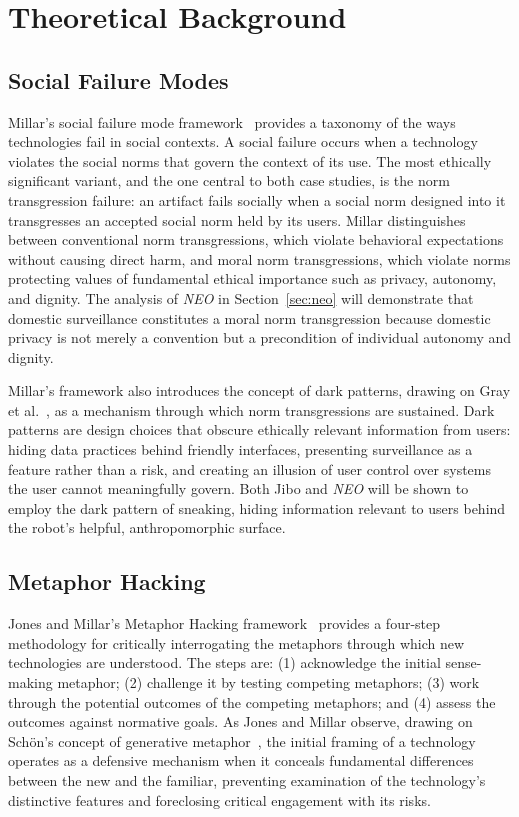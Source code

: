 \documentclass[11pt,showkeys]{../../shared/essay}
\newcommand{\neo}{\textit{NEO}}
\begin{document}
\section{Theoretical Background}
\label{sec:background}

\subsection{Social Failure Modes}

Millar's social failure mode framework~\cite{millar_social_2020} provides a taxonomy of the ways technologies fail in social contexts. A social failure occurs when a technology violates the social norms that govern the context of its use. The most ethically significant variant, and the one central to both case studies, is the norm transgression failure: an artifact fails socially when a social norm designed into it transgresses an accepted social norm held by its users. Millar distinguishes between conventional norm transgressions, which violate behavioral expectations without causing direct harm, and moral norm transgressions, which violate norms protecting values of fundamental ethical importance such as privacy, autonomy, and dignity. The analysis of \neo{} in Section~\ref{sec:neo} will demonstrate that domestic surveillance constitutes a moral norm transgression because domestic privacy is not merely a convention but a precondition of individual autonomy and dignity.

Millar's framework also introduces the concept of dark patterns, drawing on Gray et al.~\cite{gray_dark_2018}, as a mechanism through which norm transgressions are sustained. Dark patterns are design choices that obscure ethically relevant information from users: hiding data practices behind friendly interfaces, presenting surveillance as a feature rather than a risk, and creating an illusion of user control over systems the user cannot meaningfully govern. Both Jibo and \neo{} will be shown to employ the dark pattern of sneaking, hiding information relevant to users behind the robot's helpful, anthropomorphic surface.

\subsection{Metaphor Hacking}

Jones and Millar's Metaphor Hacking framework~\cite{jones_hacking_2017} provides a four-step methodology for critically interrogating the metaphors through which new technologies are understood. The steps are: (1) acknowledge the initial sense-making metaphor; (2) challenge it by testing competing metaphors; (3) work through the potential outcomes of the competing metaphors; and (4) assess the outcomes against normative goals. As Jones and Millar observe, drawing on Sch\"{o}n's concept of generative metaphor~\cite{schon_generative_1993}, the initial framing of a technology operates as a defensive mechanism when it conceals fundamental differences between the new and the familiar, preventing examination of the technology's distinctive features and foreclosing critical engagement with its risks.
\end{document}
